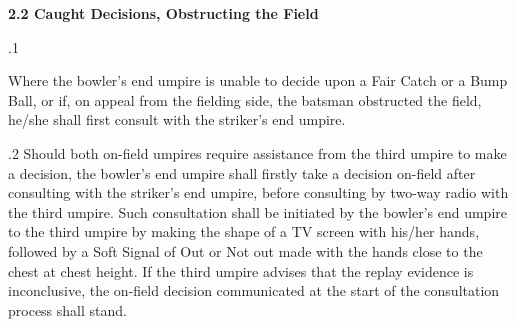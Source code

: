\documentclass[12pt]{article}
\begin{document}
\vspace{\baselineskip}
{\fontsize{11pt}{13.2pt}\selectfont \textbf{2.2 \tabto{0.47in} Caught Decisions, Obstructing the Field}\par}\par


\vspace{\baselineskip}
\begin{adjustwidth}{0.5in}{0.14in}
{\fontsize{9pt}{10.8pt}.1 \tabto{0.49in} {\fontsize{8pt}{9.6pt}\selectfont Where the bowler’s end umpire is unable to decide upon a Fair Catch or a Bump Ball, or if, on appeal from the fielding side, the batsman obstructed the field, he/she shall first consult with the striker’s end umpire.\par}\par}\par

\end{adjustwidth}


\vspace{\baselineskip}
\begin{adjustwidth}{0.5in}{0.03in}
{\fontsize{9pt}{10.8pt}.2 \tabto{0.49in} Should both on-field umpires require assistance from the third umpire to make a decision, the bowler’s end umpire shall firstly take a decision on-field after consulting with the striker’s end umpire, before consulting by two-way radio with the third umpire. Such consultation shall be initiated by the bowler’s end umpire to the third umpire by making the shape of a TV screen with his/her hands, followed by a Soft Signal of Out or Not out made with the hands close to the chest at chest height. If the third umpire advises that the replay evidence is inconclusive, the on-field decision communicated at the start of the consultation process shall stand.\par}\par

\end{adjustwidth}
\end{document}
